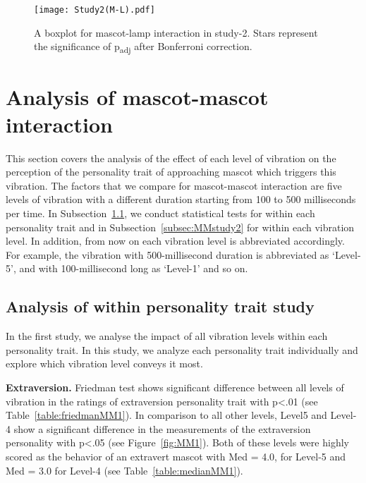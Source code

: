 \begin{figure}[H]
    \centering
    \texttt{[image: Study2(M-L).pdf]}
    \caption[]{A boxplot for mascot-lamp interaction in study-2.
    Stars represent the significance of p\textsubscript{adj} after Bonferroni correction.\footnotemark}
    \label{fig:ML2}
\end{figure}
\section{Analysis of mascot-mascot interaction}
\label{sec:m-m}
This section covers the analysis of the effect of each level of vibration on the perception
of the personality trait of approaching mascot which triggers this vibration.
The factors that we compare for mascot-mascot interaction are five levels of vibration
with a different duration starting from 100 to 500 milliseconds per time.
In Subsection~\ref{subsec:MMstudy1}, we conduct statistical tests for within each
personality trait and in Subsection~\ref{subsec:MMstudy2} for within each vibration level.
In addition, from now on each vibration level is abbreviated accordingly.
For example, the vibration with 500-millisecond duration is abbreviated
as ‘Level-5’, and with 100-millisecond long as ‘Level-1’ and so on.

\subsection{Analysis of within personality trait study}
\label{subsec:MMstudy1}
In the first study, we analyse the impact of all vibration levels within each personality trait.
In this study, we analyze each personality trait individually and explore which vibration
level conveys it most.

\par\textbf{Extraversion.}
Friedman test shows significant difference between all levels of vibration in the
ratings of extraversion personality trait with p<.01 (see Table~\ref{table:friedmanMM1}).
In comparison to all other levels, Level5 and Level-4 show a significant difference
in the measurements of the extraversion personality with p<.05 (see Figure~\ref{fig:MM1}).
Both of these levels were highly scored as the behavior of an extravert mascot
with Med = 4.0, for Level-5 and Med = 3.0 for Level-4 (see Table~\ref{table:medianMM1}).

